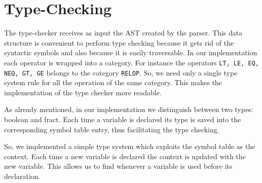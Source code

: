 \section{Type-Checking}
\label{sec:type-checking}

The type-checker receives as input the AST created by the 
parser. This data structure is convenient to perform
type checking because it gets rid of the syntactic symbols and also because it 
is easily traversable.
In our implementation each operator is wrapped into a category.
For instance the operators \verb|LT, LE, EQ, NEQ, GT, GE| belongs to the 
category \verb|RELOP|. So, we need only a single type system rule for all the
operation of the same category.
This makes the implementation of the type checker more readable.


As already mentioned, in our implementation we distinguish between two types:
boolean and fract. Each time a variable is declared its type is saved into the 
corresponding symbol table entry, thus facilitating the type checking.

So, we implemented a simple type system which exploits the symbol
table as the context. Each time a new variable is declared 
the context is updated with the new variable. This allows us to find whenever
a variable is used before its declaration.
